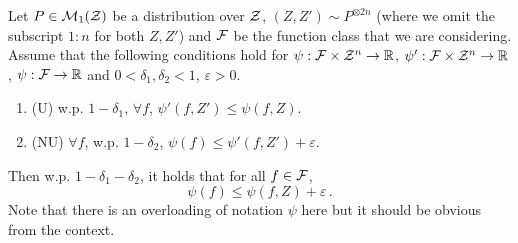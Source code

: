 \documentclass[twoside]{article}
\begin{document}
\begin{proposition}\label{lem:psi}
    Let $P \in \mathcal{M}_1(\mathcal{Z})$ be a distribution over $\mathcal{Z}$, $(Z, Z') \sim P^{\otimes 2n}$ (where we omit the subscript $1:n$ for both $Z,Z'$) and $\mathcal{F}$ be the function class that we are considering. Assume that the following conditions hold for $\psi:\mathcal{F} \times \mathcal{Z}^n \to \mathbb{R}$, $\psi':\mathcal{F} \times \mathcal{Z}^n \to \mathbb{R}$, $\psi:\mathcal{F} \to \mathbb{R}$ and $0 < \delta_1, \delta_2 < 1$, $\varepsilon > 0$.
    \begin{enumerate}
        \item (U) w.p. $1-\delta_1$, $\forall f$, $\psi'(f, Z') \le \psi(f,Z)$.
        \item (NU) $\forall f$, w.p. $1-\delta_2$, $\psi(f) \le \psi'(f, Z') + \varepsilon$.
    \end{enumerate}
    Then w.p. $1-\delta_1-\delta_2$, it holds that for all $ f\in \mathcal{F}$,
    \[
        \psi(f) \le \psi(f,Z) + \varepsilon\,.
    \]
    Note that there is an overloading of notation $\psi$ here but it should be obvious from the context.
\end{proposition}
\end{document}
